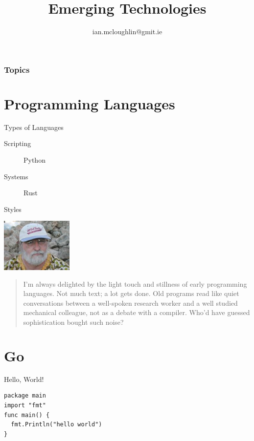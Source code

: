 
\title{Emerging Technologies}
\subtitle{}
\author{ian.mcloughlin@gmit.ie}
\date{}


\begin{frame}
  \titlepage
\end{frame}

\begin{frame}
  \frametitle{Topics}
  \tableofcontents
\end{frame}

\section{Programming Languages}


\begin{frame}{Types of Languages}
  \begin{description}
    \item[Scripting] Python
    \vspace{0.25cm}
    \item[Systems] Rust
  \end{description}
\end{frame}


\begin{frame}{Styles}
  \begin{center}
    \includegraphics[width=1.4in]{img/richard-gabriel.jpg}
  \end{center}
  \begin{quote}
    I'm always delighted by the light touch and stillness of early programming languages.
    Not much text; a lot gets done.
    Old programs read like quiet conversations between a well-spoken research worker and a well studied mechanical colleague, not as a debate with a compiler.
    Who'd have guessed sophistication bought such noise? \\
    \hspace*{}
  \end{quote}

\end{frame}

\section{Go}
\begin{frame}[fragile]{Hello, World!}
  \begin{verbatim}
package main
import "fmt"
func main() {
  fmt.Println("hello world")
}
  \end{verbatim}
\end{frame}
